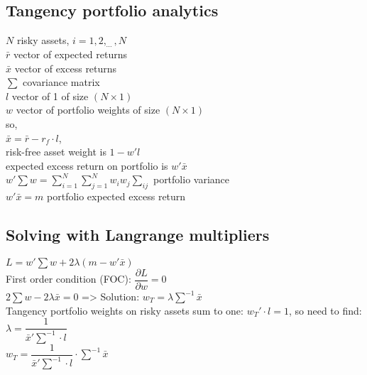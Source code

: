 \subsection*{Tangency portfolio analytics}
$N$ risky assets, $i= 1, 2,_{\cdots},N$\\
$\bar{r}$ vector of expected returns\\
$\bar{x}$ vector of excess returns\\
$\sum$ covariance matrix\\
$l$ vector of 1 of size $(N\times1)$\\
$w$ vector of portfolio weights of size $(N\times1)$\\
so,\\
$\bar{x} = \bar{r} - r_f\cdot l$,\\
risk-free asset weight is $1-w'l$\\
expected excess return on portfolio is $w'\bar{x}$\\
$w'\sum w= \sum_{i=1}^N\sum_{j=1}^Nw_iw_j\sum_{ij}$ portfolio variance\\
$w'\bar{x} = m$ portfolio expected excess return\\
\subsection*{Solving with Langrange multipliers}
$L = w'\sum w + 2\lambda(m -w'\bar{x})$\\
First order condition (FOC): $\dfrac{\partial{L}}{\partial{w}} = 0$\\
$2\sum w - 2\lambda\bar{x} = 0$ => Solution: $w_T=\lambda\sum^{-1}\bar{x}$\\
Tangency portfolio weights on risky assets sum to one: $w_T'\cdot l = 1$, so need to find:\\
$\lambda = \dfrac{1}{\bar{x}'\sum^{-1}\cdot l}$\\
$w_T = \dfrac{1}{\bar{x}'\sum^{-1}\cdot l}\cdot\sum^{-1}\bar{x}$
